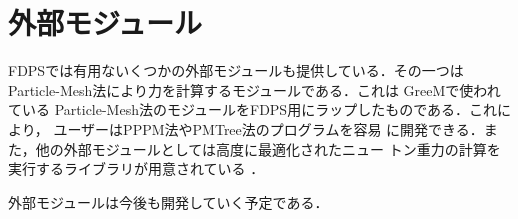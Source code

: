 \documentclass[submit,techreq,noauthor]{ipsj}
\begin{document}
\section{外部モジュール}

FDPSでは有用ないくつかの外部モジュールも提供している．その一つは
Particle-Mesh法により力を計算するモジュールである．これは
GreeM\cite{ishiyama:greem,ishiyama:gordonbell}で使われている
Particle-Mesh法のモジュールをFDPS用にラップしたものである．これにより，
ユーザーはPPPM法やPMTree法\cite{2005PASJ...57..849Y}のプログラムを容易
に開発できる．また，他の外部モジュールとしては高度に最適化されたニュー
トン重力の計算を実行するライブラリが用意されている
\cite{2006NewA...12..169N,2012NewA...17...82T,2013NewA...19...74T}．

外部モジュールは今後も開発していく予定である．







\end{document}
